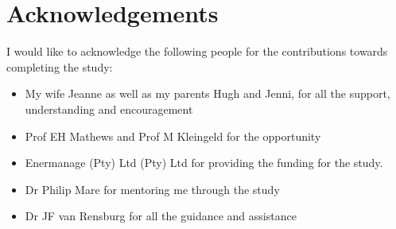 \documentclass[12pt, english, oneside]{report}%
\renewcommand{\arraystretch}{1.4}
\begin{document}
{\tiny }\section*{Acknowledgements}
\thispagestyle{plain}
\vspace{0.2cm}
I would like to acknowledge the following people for the contributions towards completing the study:
\begin{itemize}
	\item My wife Jeanne as well as my parents Hugh and Jenni,  for all the support, understanding and encouragement 
	\item Prof EH Mathews and Prof M Kleingeld for the opportunity
	\item Enermanage (Pty) Ltd (Pty) Ltd for providing the funding for the study.
	\item Dr Philip Mare for mentoring me through the study
	\item Dr JF van Rensburg  for all the guidance and assistance
\end{itemize}

\clearpage

\tableofcontents

\clearpage

\renewcommand{\arraystretch}{1.2}
\linespread{1}
	\printglossary[type=\acronymtype]
	\newpage
	\printglossary[title=Nomenclature]
	\newpage
\renewcommand{\arraystretch}{1.4}
\linespread{1.4}

	\listoffigures
	\clearpage
	\listoftables









\glsaddall
\end{document}
